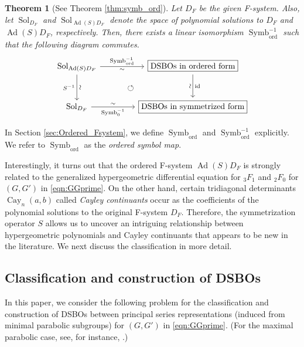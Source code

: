 \documentclass[a4paper,11pt,reqno]{amsart}
\newcommand{\0}{{\bf 0}}
\newcommand{\1}{{\bf 1}}
\DeclareMathOperator{\Cay}{Cay}
\DeclareMathOperator{\Ad}{Ad}
\DeclareMathOperator{\id}{id}
\newcommand{\ord}{{\mathrm{ord}}}
\DeclareMathOperator{\Sol}{Sol}
\DeclareMathOperator{\Symb}{Symb}
\theoremstyle{plain}
\newtheorem{thmalph}{Theorem}
\theoremstyle{definition}
\numberwithin{equation}{section}
\theoremstyle{definition}
\begin{document}
\begin{thmalph}[{{See Theorem \ref{thm:symb_ord}}}]\label{Intro:A}
Let $D_F$ be the given F-system.
Also, let $\Sol_{D_F}$ and $\Sol_{\Ad(S)D_F}$ denote the space of polynomial
solutions to $D_F$ and $\Ad(S)D_F$, respectively. Then, there exists a linear 
isomorphism $\Symb_{\ord}^{-1}$ such that the following 
diagram commutes.
\begin{equation}\label{eqn:A}
\begin{tikzcd}[row sep=1cm, column sep=1.5cm]
	{\Sol_{\Ad(S)D_F}} 
	& {\fbox{\textnormal{DSBOs in ordered form}}}
	\arrow[dl, pos=0.5, phantom, "\circlearrowleft"]\\
		{\Sol_{D_F}} 
	& {\fbox{\textnormal{DSBOs in symmetrized form}}}
	\arrow["{\sim}" sloped,"{S^{-1}}"', from=1-1, to=2-1]
	\arrow["{\id}", "{\sim}"' sloped, from=1-2, to=2-2]
	\arrow["{\operatorname{Symb}_{\ord}^{-1}}","{\sim}"', from=1-1, to=1-2]
	\arrow[ "{\sim}","{\operatorname{Symb}_{0}^{-1}}"',from=2-1, to=2-2]
\end{tikzcd}
\end{equation}
\end{thmalph}

In Section \ref{sec:Ordered_Fsystem}, we define $\Symb_{\ord}$ and 
$\Symb_{\ord}^{-1}$ explicitly. We refer to $\Symb_{\ord}$ as 
the \emph{ordered symbol map}.

Interestingly, it turns out that the ordered F-system $\Ad(S)D_F$ 
is strongly related to the generalized hypergeometric differential equation 
for ${}_3F_1$ and ${}_2F_0$ for $(G,G')$ in \eqref{eqn:GGprime}.
On the other hand,  certain tridiagonal determinants $\Cay_n(a,b)$ 
called \emph{Cayley continuants} occur as the coefficients of 
the polynomial solutions to the original F-system $D_F$.
Therefore, the symmetrization operator $S$ allows us to uncover
an intriguing relationship between 
hypergeometric polynomials and Cayley continuants
that appears to be new in the literature.
We next discuss the classification in more detail.

\subsection{Classification and construction of DSBOs}

In this paper, we consider the following problem for 
the classification and construction of DSBOs
between principal series representations 
(induced from minimal parabolic subgroups) for $(G,G')$ in \eqref{eqn:GGprime}.
(For the maximal parabolic case,  see, for instance, \cite{FW19, Kubo26}.)
\end{document}
